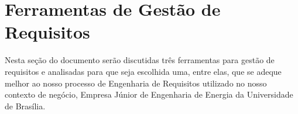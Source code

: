 \chapter[Ferramentas de Gestão de Requisitos]{Ferramentas de Gestão de Requisitos}
Nesta seção do documento serão discutidas três ferramentas para gestão de requisitos e analisadas para que seja escolhida uma, entre elas, que se adeque melhor ao nosso processo de Engenharia de Requisitos utilizado no nosso contexto de negócio, Empresa Júnior de Engenharia de Energia da Universidade de Brasília.





